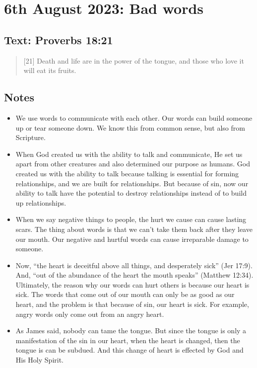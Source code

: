 \setcounter{figure}{0}

\section{6th August 2023: Bad words}
\subsection*{Text: Proverbs 18:21}
  \begin{quote}
    [21] Death and life are in the power of the tongue, and those who love it
    will eat its fruits.
  \end{quote}
\subsection*{Notes}
\begin{itemize}
  \item{We use words to communicate with each other. Our words can build someone up or tear someone down. We know this from common sense, but also from Scripture.}
  \item{When God created us with the ability to talk and communicate, He set us apart from other creatures and also determined our purpose as humans. God created us with the ability to talk because talking is essential for forming relationships, and we are built for relationships. But because of sin, now our ability to talk have the potential to destroy relationships instead of to build up relationships.}
  \item{When we say negative things to people, the hurt we cause can cause lasting scars. The thing about words is that we can’t take them back after they leave our mouth. Our negative and hurtful words can cause irreparable damage to someone. }
  \item{Now, “the heart is deceitful above all things, and desperately sick” (Jer 17:9). And, “out of the abundance of the heart the mouth speaks” (Matthew 12:34). Ultimately, the reason why our words can hurt others is because our heart is sick. The words that come out of our mouth can only be as good as our heart, and the problem is that because of sin, our heart is sick. For example, angry words only come out from an angry heart.}
  \item{As James said, nobody can tame the tongue. But since the tongue is only a manifestation of the sin in our heart, when the heart is changed, then the tongue is can be subdued. And this change of heart is effected by God and His Holy Spirit.}

\end{itemize}

